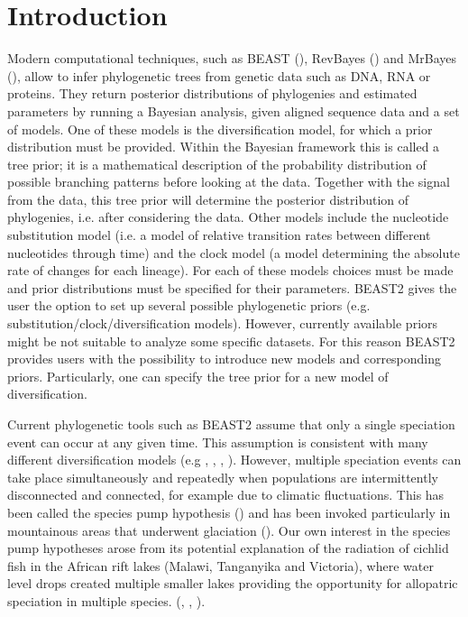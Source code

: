 \section{Introduction}

Modern computational techniques, such as BEAST (\citep{beast,beast2}), RevBayes (\citep{hohna2016revbayes}) and MrBayes (\citep{huelsenbeck2001mrbayes,ronquist2003mrbayes}), allow to infer phylogenetic trees from genetic data 
such as DNA, RNA or proteins.
They return posterior distributions of phylogenies 
and estimated parameters by running a Bayesian analysis, 
given aligned sequence data and a set of models. 
One of these models is the diversification model, for which a prior distribution must be provided. Within the Bayesian framework this is called a tree prior; it is a mathematical description 
of the probability distribution of possible branching patterns before looking at the data. Together with the signal from the data, this tree prior will determine the posterior distribution of phylogenies, i.e. after considering the data. Other models include the nucleotide substitution model (i.e. a model of relative transition rates between different nucleotides through time) and the clock model (a model determining the absolute rate of changes for each lineage). For each of these models choices must be made and prior distributions must be specified for their parameters. BEAST2 gives the user the option to set up 
several possible phylogenetic 
priors (e.g. substitution/clock/diversification models). 
However, currently available priors 
might be not suitable to analyze some specific datasets.
For this reason BEAST2 provides users with the possibility 
to introduce new models and corresponding priors. Particularly, one can specify the tree prior for a new model of diversification.

Current phylogenetic tools such as BEAST2 assume that 
only a single speciation event can occur at any given time.
This assumption is consistent with many different diversification models (e.g \cite{Maddison2007biSSE}, \cite{Valente2015}, 
\cite{etienne2012diversity}, \cite{etienne2014estimating}). However, multiple speciation events can take place simultaneously and repeatedly when populations are intermittently disconnected and connected, for example due to climatic fluctuations. This has been called the species pump hypothesis (\citep{haffer1969speciation}) and has been invoked particularly in mountainous areas that underwent glaciation (\citep{muellner2019origins}). Our own interest in the species pump hypotheses arose from its potential explanation of the radiation of cichlid fish in the African rift lakes (Malawi, Tanganyika and Victoria), where water level drops created multiple smaller lakes providing the opportunity for allopatric speciation in multiple species.  (\citep{verheyen1996mitochondrial}, \citep{sturmbauer2001lake}, \citep{janzen2017}).

